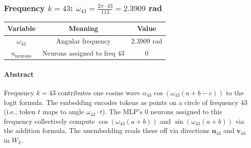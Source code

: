 \documentclass[11pt,a4paper]{article}
\begin{document}
\begin{center}
\end{center}

\subsubsection{Frequency $k = 43$: $\omega_{43} = \frac{2\pi \cdot 43}{113} = 2.3909$ rad}

\begin{center}
\begin{tabular}{|c|c|c|}
\hline
\textbf{Variable} & \textbf{Meaning} & \textbf{Value} \\ \hline
  $\omega_{43}$ & Angular frequency & $2.3909$ rad \\ \hline
  $n_{\text{neurons}}$ & Neurons assigned to freq $43$ & $0$ \\ \hline
\end{tabular}
\end{center}

\paragraph{Abstract}
Frequency $k = 43$ contributes one cosine wave $\alpha_{43} \cos(\omega_{43}(a+b-c))$ to the logit formula. The embedding encodes tokens as points on a circle of frequency $43$ (i.e., token $t$ maps to angle $\omega_{43} \cdot t$). The MLP's 0 neurons assigned to this frequency collectively compute $\cos(\omega_{43}(a+b))$ and $\sin(\omega_{43}(a+b))$ via the addition formula. The unembedding reads these off via directions $\mathbf{u}_{43}$ and $\mathbf{v}_{43}$ in $W_L$.
\end{document}
